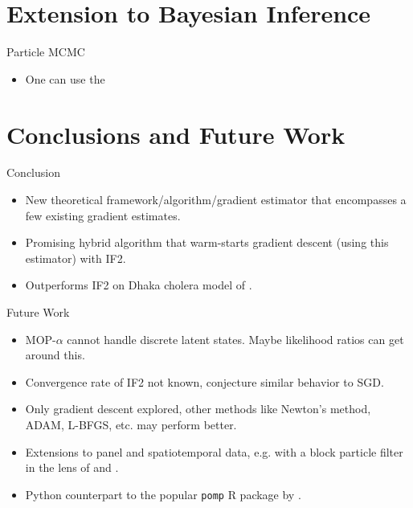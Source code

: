 \documentclass{beamer}
\begin{document}
\section{Extension to Bayesian Inference}

\begin{frame}{Particle MCMC}
    \begin{itemize}
        \item One can use the 
    \end{itemize}
\end{frame}

\section{Conclusions and Future Work}

\begin{frame}{Conclusion}
    \begin{itemize}
        \item New theoretical framework/algorithm/gradient estimator that encompasses a few existing gradient estimates.
        \item \pause Promising hybrid algorithm that warm-starts gradient descent (using this estimator) with IF2.
        \item \pause Outperforms IF2 on Dhaka cholera model of \cite{king15}.
    \end{itemize}
\end{frame}


\begin{frame}{Future Work}
    \begin{itemize}
        \item MOP-$\alpha$ cannot handle discrete latent states. Maybe likelihood ratios can get around this.
        \item \pause Convergence rate of IF2 not known, conjecture similar behavior to SGD. 
        \item \pause Only gradient descent explored, other methods like Newton's method, ADAM, L-BFGS, etc. may perform better.
        \item \pause Extensions to panel and spatiotemporal data, e.g. with a block particle filter in the lens of \cite{ionides22} and \cite{ning23}.
        \item \pause Python counterpart to the popular \texttt{pomp} R package by \citet{king16, king2017pompmanual}.
    \end{itemize}
\end{frame}




\end{document}
